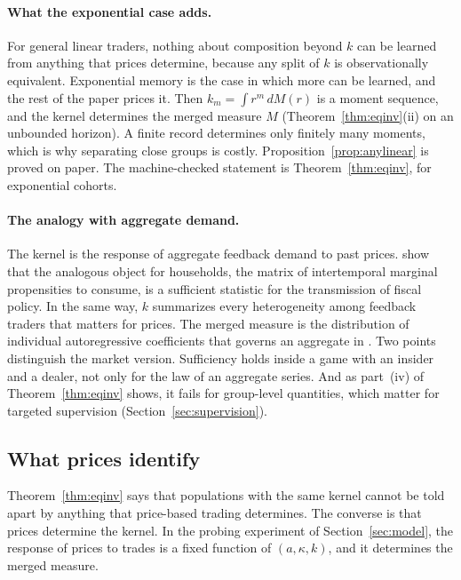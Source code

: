 \paragraph{What the exponential case adds.} For general linear traders, nothing about composition beyond $k$ can be learned from anything that prices determine, because any split of $k$ is observationally equivalent. Exponential memory is the case in which more can be learned, and the rest of the paper prices it. Then $k_m=\int r^m\,dM(r)$ is a moment sequence, and the kernel determines the merged measure $M$ (Theorem~\ref{thm:eqinv}(ii) on an unbounded horizon). A finite record determines only finitely many moments, which is why separating close groups is costly. Proposition~\ref{prop:anylinear} is proved on paper. The machine-checked statement is Theorem~\ref{thm:eqinv}, for exponential cohorts.

\paragraph{The analogy with aggregate demand.} The kernel is the response of aggregate feedback demand to past prices. \citet{auclert2024} show that the analogous object for households, the matrix of intertemporal marginal propensities to consume, is a sufficient statistic for the transmission of fiscal policy. In the same way, $k$ summarizes every heterogeneity among feedback traders that matters for prices. The merged measure is the distribution of individual autoregressive coefficients that governs an aggregate in \citet{granger1980}. Two points distinguish the market version. Sufficiency holds inside a game with an insider and a dealer, not only for the law of an aggregate series. And as part~(iv) of Theorem~\ref{thm:eqinv} shows, it fails for group-level quantities, which matter for targeted supervision (Section~\ref{sec:supervision}).

\subsection{What prices identify}

Theorem~\ref{thm:eqinv} says that populations with the same kernel cannot be told apart by anything that price-based trading determines. The converse is that prices determine the kernel. In the probing experiment of Section~\ref{sec:model}, the response of prices to trades is a fixed function of $(a,\kappa,k)$, and it determines the merged measure.

